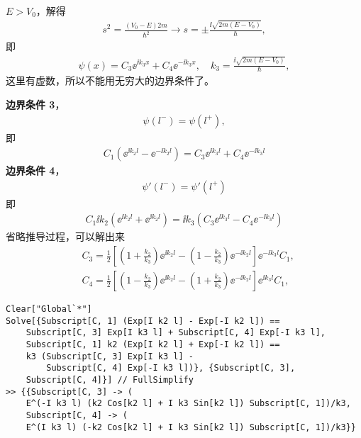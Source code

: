   $E > V_0$，解得
\begin{eqnarray}
    s^2 = \frac{(V_0 - E) 2 m}{\hbar^2} \rightarrow s = \pm \frac{\ii \sqrt{2m(E- V_0)}}{\hbar},
\end{eqnarray}
即
\begin{eqnarray}
    \psi(x) = C_3 \ee^{\ii k_3 x} + C_4 \ee^{-\ii k_3 x}, \quad k_3 = \frac{\ii\sqrt{2m(E-V_0)}}{\hbar},
\end{eqnarray}
这里有虚数，所以不能用无穷大的边界条件了。

\textbf{边界条件 3}，
\begin{eqnarray}
    \psi(l^-) = \psi(l^+),
\end{eqnarray}
即
\begin{eqnarray}
    C_1 (\ee^{\ii k_2 l} - \ee^{-\ii k_2 l}) = 
    C_3 \ee^{\ii k_3 l} + C_4 \ee^{-\ii k_3 l}
\end{eqnarray}
\textbf{边界条件 4}，
\begin{eqnarray}
    \psi'(l^-) = \psi'(l^+)
\end{eqnarray}
即
\begin{eqnarray}
    C_1 \ii k_2 (\ee^{\ii k_2 l} + \ee^{\ii k_2 l}) = \ii k_3 (C_3 \ee^{\ii k_3 l} - C_4 \ee^{-\ii k_3 l} )
\end{eqnarray}
省略推导过程，可以解出来
\begin{align}
    &C_3 = \frac12 \left[
        \left(1 + \frac{k_2}{k_3}\right) \ee^{\ii k_2 l} - 
        \left(1 - \frac{k_2}{k_3}\right) \ee^{-\ii k_2 l}
    \right] \ee^{-\ii k_3 l }C_1, \label{eq:half_inf_scat_c3}\\
    &C_4 = \frac12 \left[
        \left(1 - \frac{k_2}{k_3}\right) \ee^{\ii k_2 l} - 
        \left(1 + \frac{k_2}{k_3}\right) \ee^{-\ii k_2 l}
    \right] \ee^{\ii k_3 l} C_1, \label{eq:half_inf_scat_c4}
\end{align}
\begin{lstlisting}
Clear["Global`*"]
Solve[{Subscript[C, 1] (Exp[I k2 l] - Exp[-I k2 l]) == 
    Subscript[C, 3] Exp[I k3 l] + Subscript[C, 4] Exp[-I k3 l], 
    Subscript[C, 1] k2 (Exp[I k2 l] + Exp[-I k2 l]) == 
    k3 (Subscript[C, 3] Exp[I k3 l] - 
        Subscript[C, 4] Exp[-I k3 l])}, {Subscript[C, 3], 
    Subscript[C, 4]}] // FullSimplify
>> {{Subscript[C, 3] -> (
    E^(-I k3 l) (k2 Cos[k2 l] + I k3 Sin[k2 l]) Subscript[C, 1])/k3, 
    Subscript[C, 4] -> (
    E^(I k3 l) (-k2 Cos[k2 l] + I k3 Sin[k2 l]) Subscript[C, 1])/k3}}
\end{lstlisting}

